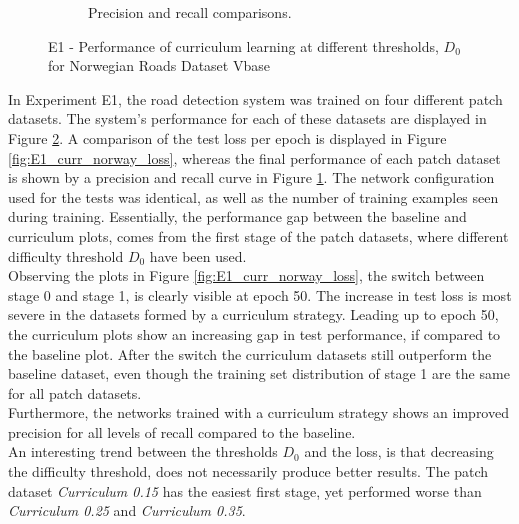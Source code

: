 \begin{figure}[!h]
\begin{subfigure}{0.48\textwidth}
\caption{Precision and recall comparisons.} \label{fig:E1_curr_norway_pr}
\end{subfigure}
\hspace*{\fill} %
\caption{E1 - Performance of curriculum learning at different thresholds, $D_{0}$ for Norwegian Roads Dataset Vbase} \label{fig:E1_curriculum_norway}
\end{figure}

In Experiment E1, the road detection system was trained on four different patch datasets. The system's performance for each of these datasets are displayed in Figure \ref{fig:E1_curriculum_norway}. A comparison of the test loss per epoch is displayed in Figure \ref{fig:E1_curr_norway_loss}, whereas the final performance of each patch dataset is shown by a precision and recall curve in Figure \ref{fig:E1_curr_norway_pr}. The network configuration used for the tests was identical, as well as the number of training examples seen during training. Essentially, the performance gap between the baseline and curriculum plots, comes from the first stage of the patch datasets, where different difficulty threshold $D_0$ have been used.\\

Observing the plots in Figure \ref{fig:E1_curr_norway_loss}, the switch between stage 0 and stage 1, is clearly visible at epoch 50. The increase in test loss is most severe in the datasets formed by a curriculum strategy. Leading up to epoch 50, the curriculum plots show an increasing gap in test performance, if compared to the baseline plot. After the switch the curriculum datasets still outperform the baseline dataset, even though the training set distribution of stage 1 are the same for all patch datasets.\\

Furthermore, the networks trained with a curriculum strategy shows an improved precision for all levels of recall compared to the baseline.\\

An interesting trend between the thresholds $D_0$ and the loss, is that decreasing the difficulty threshold, does not necessarily produce better results. The patch dataset \textit{Curriculum 0.15} has the easiest first stage, yet performed worse than \textit{Curriculum 0.25} and \textit{Curriculum 0.35}. \\

